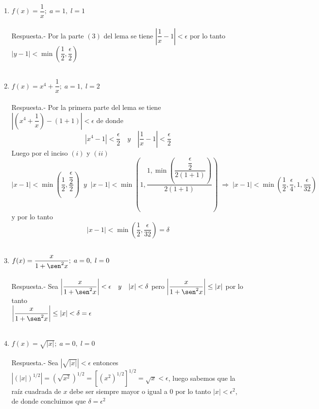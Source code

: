 \begin{enumerate}
\begin{enumerate}[\bfseries (i)]
    \item $f(x) =\dfrac{1}{x}; \; a=1,\; l=1$\\\\
	Respuesta.-\; Por la parte $(3)$ del lema se tiene $\left|\dfrac{1}{x} - 1\right|<\epsilon$ por lo tanto $|y-1|< \min\left(\dfrac{1}{2},\dfrac{\epsilon}{2}\right)$\\\\

    \item $f(x)=x^4 + \dfrac{1}{x}; \; a=1, \; l=2$\\\\
	Respuesta.-\; Por la primera parte del lema se tiene $\left|\left(x^4+\dfrac{1}{x}\right)-(1+1)\right|<\epsilon$ de donde $$|x^4-1|<\dfrac{\epsilon}{2} \quad y \quad \left|\dfrac{1}{x}-1\right|<\dfrac{\epsilon}{2}$$
	Luego por el inciso $(i)$ y $(ii)$ $$\left|x-1\right|<\min\left(\dfrac{1}{2},\dfrac{\dfrac{\epsilon}{2}}{2}\right) \;\; y \;\; \left|x-1\right|<\min\left(1,\dfrac{1,\min\left(\dfrac{\dfrac{\epsilon}{2}}{2(1+1)}\right)}{2(1+1)}\right) \; \Longrightarrow \;|x-1|<\min\left(\dfrac{1}{2},\dfrac{\epsilon}{4},1,\dfrac{\epsilon}{32}\right)$$
	y por lo tanto $$|x-1|<\min\left(\dfrac{1}{2},\dfrac{\epsilon}{32}\right)=\delta$$\\


    \item $f(x)=\dfrac{x}{1 + \sen^2 x}; \; a=0, \; l=0$\\\\
	Respuesta.-\; Sea $\left|\dfrac{x}{1+\sen^2 x}\right|<\epsilon \quad y \quad  |x|<\delta$ pero $\left|\dfrac{x}{1+\sen^2 x}\right|\leq |x|$ por lo tanto \\ $\left|\dfrac{x}{1+\sen^2 x}\right|\leq |x|<\delta=\epsilon$\\\\

    \item $f(x)=\sqrt{|x|};\; a=0,\; l=0$\\\\
	Respuesta.-\; Sea $\left|\sqrt{|x|}\right|<\epsilon$ entonces $\left|(|x|)^{1/2}\right| = \left(\sqrt{x^2}\right)^{1/2} = \left[(x^2)^{1/2}\right]^{1/2}=\sqrt{x}<\epsilon$, luego sabemos que la raíz cuadrada de $x$ debe ser siempre mayor o igual a $0$ por lo tanto $|x|<\epsilon^2$, de donde concluimos que $\delta=\epsilon^2$\\\\


\end{enumerate}
\end{enumerate}
